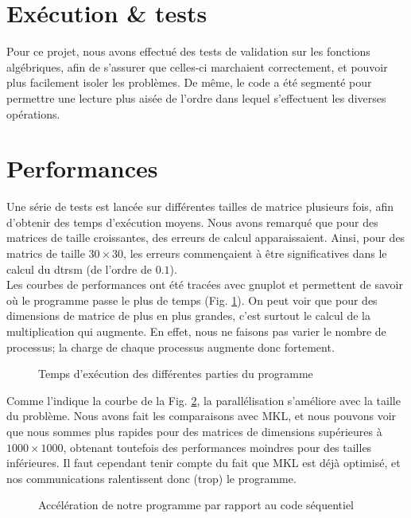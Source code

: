 \section{Exécution \& tests} %
\label{sec:execution}

Pour ce projet, nous avons effectué des tests de validation sur les fonctions algébriques, afin de s'assurer que celles-ci marchaient correctement, et pouvoir plus facilement isoler les problèmes. 
De même, le code a été segmenté pour permettre une lecture plus aisée de l'ordre dans lequel s'effectuent les diverses opérations.

\section{Performances} %
\label{sec:perf}

Une série de tests est lancée sur différentes tailles de matrice plusieurs fois, afin d'obtenir des temps d'exécution moyens. Nous avons remarqué que pour des matrices de taille croissantes, des erreurs de calcul apparaissaient. Ainsi, pour des matrics de taille $30 \times 30$, les erreurs commençaient à être significatives dans le calcul du dtrsm (de l'ordre de $0.1$).\\
Les courbes de performances ont été tracées avec gnuplot et permettent de savoir où le programme passe le plus de temps (Fig. \ref{fig:diff}). On peut voir que pour des dimensions de matrice de plus en plus grandes, c'est surtout le calcul de la multiplication qui augmente. En effet, nous ne faisons pas varier le nombre de processus; la charge de chaque processus augmente donc fortement.

\begin{figure}[H]
\centering
\caption{Temps d'exécution des différentes parties du programme}
\label{fig:diff}
\end{figure}

Comme l'indique la courbe de la Fig. \ref{fig:sp}, la parallélisation s'améliore avec la taille du problème. Nous avons fait les comparaisons avec MKL, et nous pouvons voir que nous sommes plus rapides pour des matrices de dimensions supérieures à $1000\times1000$, obtenant toutefois des performances moindres pour des tailles inférieures. Il faut cependant tenir compte du fait que MKL est déjà optimisé, et nos communications ralentissent donc (trop) le programme.

\begin{figure}[H]
\centering
\caption{Accélération de notre programme par rapport au code séquentiel}
\label{fig:sp}
\end{figure}

